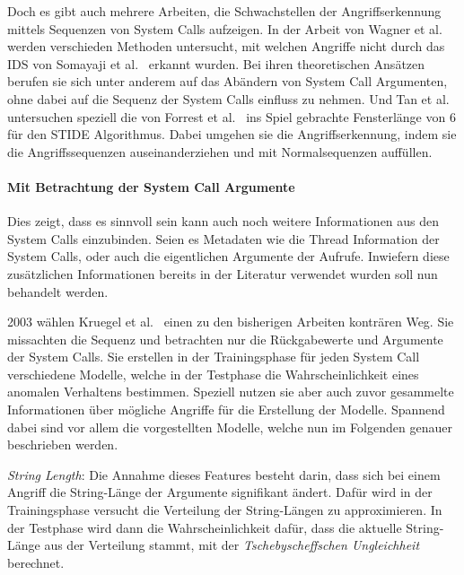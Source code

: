             Doch es gibt auch mehrere Arbeiten, die Schwachstellen der Angriffserkennung mittels Sequenzen von System Calls aufzeigen.
            In der Arbeit von Wagner et al.~\cite{Syscallseqexploit1} werden verschieden Methoden untersucht, mit welchen Angriffe nicht durch das IDS von Somayaji et al.~\cite{FORREST2000} erkannt wurden.
            Bei ihren theoretischen Ansätzen berufen sie sich unter anderem auf das Abändern von System Call Argumenten, ohne dabei auf die Sequenz der System Calls einfluss zu nehmen.
            UndTan et al.~\cite{Syscallseqexploit3} untersuchen speziell die von Forrest et al.~\cite{FORREST} ins Spiel gebrachte Fensterlänge von $6$ für den \ac{STIDE} Algorithmus.
            Dabei umgehen sie die Angriffserkennung, indem sie die Angriffssequenzen auseinanderziehen und mit Normalsequenzen auffüllen.


        \paragraph{Mit Betrachtung der System Call Argumente}\label{sec:related_sys_arg}
            Dies zeigt, dass es sinnvoll sein kann auch noch weitere Informationen aus den System Calls einzubinden.
            Seien es Metadaten wie die Thread Information der System Calls, oder auch die eigentlichen Argumente der Aufrufe.
            Inwiefern diese zusätzlichen Informationen bereits in der Literatur verwendet wurden soll nun behandelt werden.

            2003 wählen Kruegel et al.~\cite{ARGUMENTS} einen zu den bisherigen Arbeiten konträren Weg.
            Sie missachten die Sequenz und betrachten nur die Rückgabewerte und Argumente der System Calls.
            Sie erstellen in der Trainingsphase für jeden System Call verschiedene Modelle, welche in der Testphase die Wahrscheinlichkeit eines anomalen Verhaltens bestimmen.
            Speziell nutzen sie aber auch zuvor gesammelte Informationen über mögliche Angriffe für die Erstellung der Modelle.
            Spannend dabei sind vor allem die vorgestellten Modelle, welche nun im Folgenden genauer beschrieben werden.

            \textit{String Length}: Die Annahme dieses Features besteht darin, dass sich bei einem Angriff die String-Länge der Argumente signifikant ändert.
            Dafür wird in der Trainingsphase versucht die Verteilung der String-Längen zu approximieren.
            In der Testphase wird dann die Wahrscheinlichkeit dafür, dass die aktuelle String-Länge aus der Verteilung stammt, mit der \textit{Tschebyscheffschen Ungleichheit} berechnet.
            
